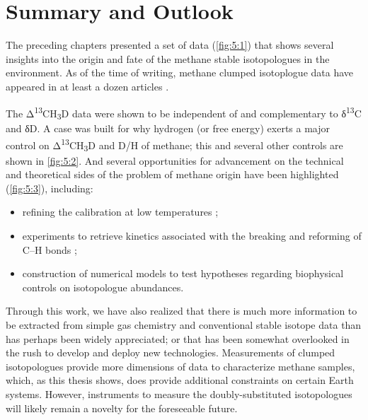 \chapter{Summary and Outlook}\label{ch:5}



The preceding chapters presented a set of data (\autoref{fig:5:1}) that shows
several insights into the origin and fate of the methane stable
isotopologues in the environment. As of the time of writing, methane
clumped isotoplogue data have appeared in at least a dozen articles \parencite{Douglas++_2016_GCA,Stolper++_2014_GCA,Stolper++_2014_S,Stolper++_2015_GCA,Wang++_2015_S,Whitehill++_2017_GCA,Ono++_2014_AC,Wang++_2016_GCA,Lopes++_2016_JoDS,Inagaki++_2015_S,Young++_2016_IJMS,Young++_2017_GCA}.



The Δ\textsuperscript{13}CH\textsubscript{3}D data were shown to be
independent of and complementary to δ\textsuperscript{13}C and δD. A
case was built for why hydrogen (or free energy) exerts a major control
on Δ\textsuperscript{13}CH\textsubscript{3}D and D/H of methane; this
and several other controls are shown in \autoref{fig:5:2}. And several
opportunities for advancement on the technical and theoretical sides of
the problem of methane origin have been highlighted (\autoref{fig:5:3}), including:
\begin{itemize}
	\item
	refining the calibration at low temperatures \parencite{Larson+Hall_1965_JPC,Naito++_2005_ApCat,Golden++_2001_JACS,Robertson++_1975_TFS};
	\item
	experiments to retrieve kinetics associated with the breaking and
	reforming of C--H bonds \parencite{Reeves++_2012_GCA,Lyon+Hulston_1984_GCA,Koepp_1978};
	\item
	construction of numerical models to test hypotheses regarding
	biophysical controls on isotopologue abundances.
\end{itemize}



Through this work, we have also realized that there is much more
information to be extracted from simple gas chemistry and conventional
stable isotope data than has perhaps been widely appreciated; or that
has been somewhat overlooked in the rush to develop and deploy new
technologies. Measurements of clumped isotopologues provide more
dimensions of data to characterize methane samples, which, as this
thesis shows, does provide additional constraints on certain Earth
systems. However, instruments to measure the doubly-substituted
isotopologues will likely remain a novelty for the foreseeable future.

